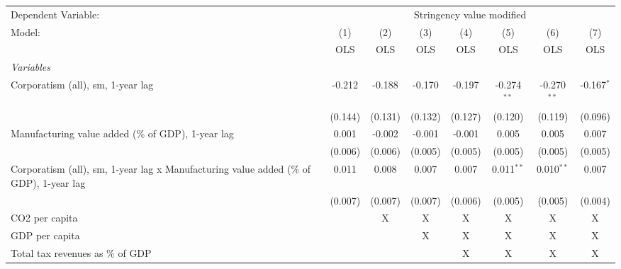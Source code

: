 
\begingroup
\centering
\begin{tabular}{lccccccc}
   \toprule
   Dependent Variable: & \multicolumn{7}{c}{Stringency value modified}\\
   Model:                                                                                 & (1)     & (2)     & (3)     & (4)     & (5)           & (6)           & (7)\\  
                                                                                          &  OLS    & OLS     & OLS     & OLS     & OLS           & OLS           & OLS\\  
   \midrule
   \emph{Variables}\\
   Corporatism (all), sm, 1-year lag                                                      & -0.212  & -0.188  & -0.170  & -0.197  & -0.274$^{**}$ & -0.270$^{**}$ & -0.167$^{*}$\\   
                                                                                          & (0.144) & (0.131) & (0.132) & (0.127) & (0.120)       & (0.119)       & (0.096)\\   
   Manufacturing value added (\% of GDP), 1-year lag                                      & 0.001   & -0.002  & -0.001  & -0.001  & 0.005         & 0.005         & 0.007\\   
                                                                                          & (0.006) & (0.006) & (0.005) & (0.005) & (0.005)       & (0.005)       & (0.005)\\   
   Corporatism (all), sm, 1-year lag x Manufacturing value added (\% of GDP), 1-year lag  & 0.011   & 0.008   & 0.007   & 0.007   & 0.011$^{**}$  & 0.010$^{**}$  & 0.007\\   
                                                                                          & (0.007) & (0.007) & (0.007) & (0.006) & (0.005)       & (0.005)       & (0.004)\\   
   CO2 per capita                                                                         &         & X       & X       & X       & X             & X             & X\\  
   GDP per capita                                                                         &         &         & X       & X       & X             & X             & X\\  
   Total tax revenues as \% of GDP                                                        &         &         &         & X       & X             & X             & X\\  

\end{tabular}
